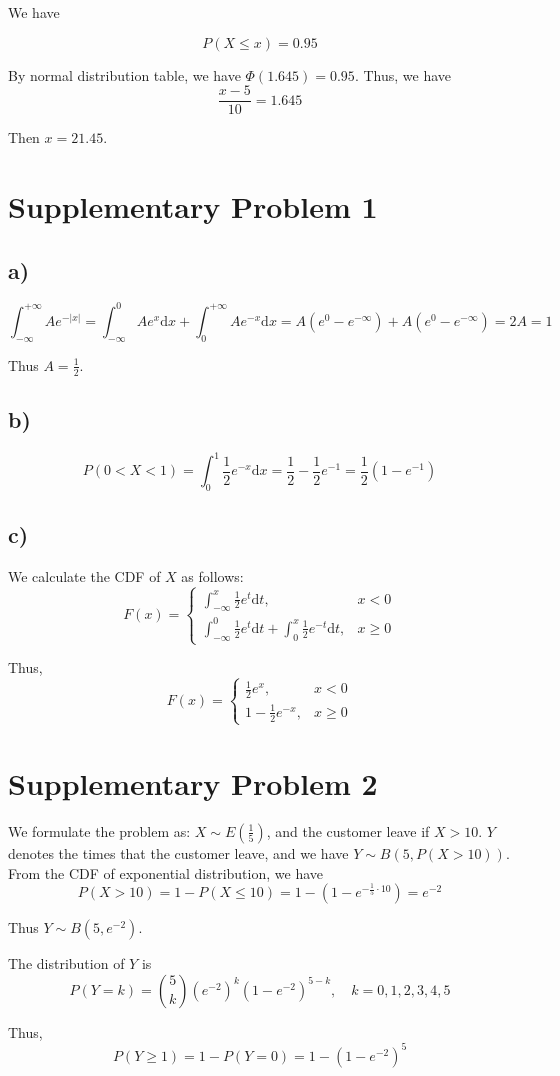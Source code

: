 \documentclass[a4paper, UTF-8]{article}
\theoremstyle{plain}
\begin{document}
We have 

$$
P(X \leq x) = 0.95
$$

By normal distribution table, we have $\Phi(1.645) = 0.95$. Thus, we have
$$
\frac{x - 5}{10} = 1.645
$$

Then $x = 21.45$.

\section{Supplementary Problem 1}

\subsection{a)} 

$$
\int_{-\infty}^{+\infty} Ae^{-|x|} = \int_{-\infty}^{0} Ae^{x} \mathrm{d}x + \int_{0}^{+\infty} Ae^{-x} \mathrm{d}x = A(e^0 - e^{-\infty}) + A(e^0 - e^{-\infty}) = 2A = 1
$$

Thus $A = \frac{1}{2}$.

\subsection{b)} 

$$
P(0 < X < 1) = \int_{0}^1 \frac{1}{2}e^{-x}\mathrm{d}x = \frac{1}{2} - \frac{1}{2}e^{-1} = \frac{1}{2}(1 - e^{-1})
$$

\subsection{c)} 

We calculate the CDF of $X$ as follows:
$$
F(x) = \begin{cases} 
    \int_{-\infty}^x \frac{1}{2}e^{t} \mathrm{d}t, & x < 0 \\
    \int_{-\infty}^0 \frac{1}{2}e^{t} \mathrm{d}t + \int_{0}^x \frac{1}{2}e^{-t} \mathrm{d}t, & x \geq 0
\end{cases}
$$


Thus, 
$$
F(x) = \begin{cases} 
    \frac{1}{2}e^{x}, & x < 0 \\
    1 - \frac{1}{2}e^{-x}, & x \geq 0
\end{cases}
$$

\section{Supplementary Problem 2}

We formulate the problem as: $X \sim E(\frac{1}{5})$, and the customer leave if $X > 10$. $Y$ denotes the times that the customer leave, and we have $Y \sim B(5, P(X > 10))$. From the CDF of exponential distribution, we have
$$
P(X > 10) = 1 - P(X \leq 10) = 1 - (1 - e^{-\frac{1}{5} \cdot 10}) = e^{-2}
$$

Thus $Y \sim B(5, e^{-2})$. 

The distribution of $Y$ is
$$
P(Y = k) = \binom{5}{k} (e^{-2})^k (1 - e^{-2})^{5-k}, \quad k = 0, 1, 2, 3, 4, 5
$$

Thus, 
$$
P(Y \geq 1) = 1 - P(Y = 0) = 1 - (1 - e^{-2})^5
$$
\end{document}
